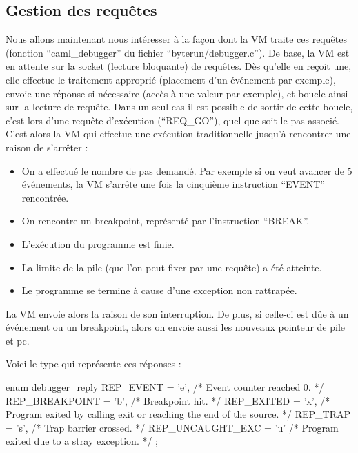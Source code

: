 \documentclass[11pt,a4paper]{report}
\begin{document}
\medskip

\subsection{Gestion des requêtes}

Nous allons maintenant nous intéresser à la façon dont la VM traite ces requêtes (fonction ``caml\_debugger'' du fichier ``byterun/debugger.c''). De base, la VM est en attente sur la socket (lecture bloquante) de requêtes. Dès qu'elle en reçoit une, elle effectue le traitement approprié (placement d'un événement par exemple), envoie une réponse si nécessaire (accès à une valeur par exemple), et boucle ainsi sur la lecture de requête. Dans un seul cas il est possible de sortir de cette boucle, c'est lors d'une requête d'exécution (``REQ\_GO''), quel que soit le pas associé. C'est alors la VM qui effectue une exécution traditionnelle jusqu'à rencontrer une raison de s'arrêter :

\smallskip

\begin{itemize}
\item On a effectué le nombre de pas demandé. Par exemple si on veut avancer de 5 événements, la VM s'arrête une fois la cinquième instruction ``EVENT'' rencontrée.
\item On rencontre un breakpoint, représenté par l'instruction ``BREAK''.
\item L'exécution du programme est finie.
\item La limite de la pile (que l'on peut fixer par une requête) a été atteinte.
\item Le programme se termine à cause d'une exception non rattrapée.
\end{itemize}

\smallskip

La VM envoie alors la raison de son interruption. De plus, si celle-ci est dûe à un événement ou un breakpoint, alors on envoie aussi les nouveaux pointeur de pile et pc.

\smallskip

Voici le type qui représente ces réponses :

\smallskip

\begin{C}

enum debugger_reply {
  REP_EVENT = 'e',
  /* Event counter reached 0. */
  REP_BREAKPOINT = 'b',
  /* Breakpoint hit. */
  REP_EXITED = 'x',
  /* Program exited by calling exit or reaching the end of the source. */
  REP_TRAP = 's',
  /* Trap barrier crossed. */
  REP_UNCAUGHT_EXC = 'u'
  /* Program exited due to a stray exception. */
};

\end{C}
\end{document}
